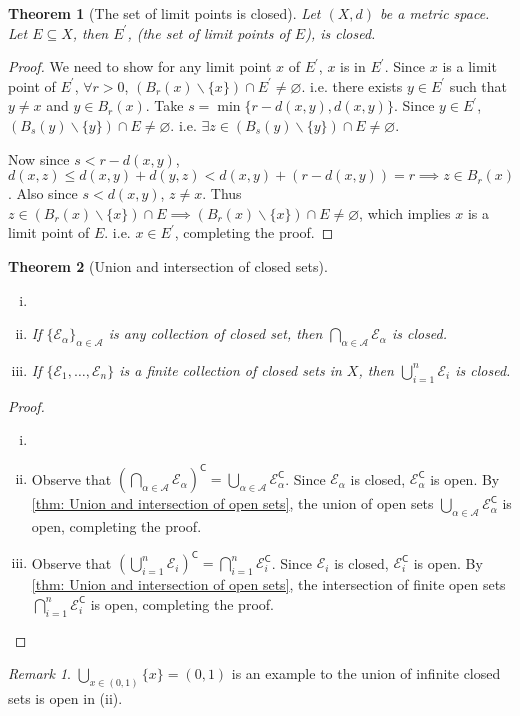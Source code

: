 \documentclass[12pt, lettersize]{book}
\theoremstyle{plain}
\newtheorem{thm}{Theorem}[section]
\theoremstyle{definition}
\theoremstyle{remark}
\newtheorem*{rem}{Remark}
\newcommand{\com}{\mathsf{C}}
\let\emptyset\varnothing
\begin{document}
		\begin{thm}[The set of limit points is closed]
		Let $(X,d)$ be a metric space. Let $E\subseteq X$, then $E^\prime$, (the set of limit points of $E$), is closed.
		\end{thm}
		\begin{proof}
		We need to show for any limit point $x$ of $E^\prime$, $x$ is in $E^\prime$. Since $x$ is a limit point of $E^\prime$, $\forall r>0$, $(B_r(x)\backslash\{x\})\cap E^\prime\neq\emptyset$. i.e. there exists $y\in E^\prime$ such that $y\neq x$ and $y\in B_r(x)$. Take $s=\min\{r-d(x,y), d(x,y)\}$. Since $y\in E^\prime$, $(B_s(y)\backslash\{y\})\cap E\neq\emptyset$. i.e. $\exists z\in(B_s(y)\backslash\{y\})\cap E\neq\emptyset$.\smallskip
		
		Now since $s<r-d(x,y)$, $d(x,z)\leq d(x,y)+d(y,z)<d(x,y)+(r-d(x,y))=r\implies z\in B_r(x)$. Also since $s<d(x,y)$, $z\neq x$. Thus $z\in(B_r(x)\backslash\{x\})\cap E\implies (B_r(x)\backslash\{x\})\cap E\neq\emptyset$, which implies $x$ is a limit point of $E$. i.e. $x\in E^\prime$, completing the proof. 
		\end{proof}
		
		\begin{thm}[Union and intersection of closed sets]
		\begin{enumerate}[(i)]
			\item[]
			\item If $\{\mathcal{E}_\alpha\}_{\alpha\in\mathcal{A}}$ is any collection of closed set, then $\bigcap_{\alpha\in\mathcal{A}}\mathcal{E}_\alpha$ is closed.
			\item If $\{\mathcal{E}_1,\dots,\mathcal{E}_n\}$ is a finite collection of closed sets in $X$, then $\bigcup_{i=1}^{n}\mathcal{E}_i$ is closed.
		\end{enumerate}
		\end{thm}
		\begin{proof}
		\begin{enumerate}[(i)]
			\item[]
			\item Observe that $\left(\bigcap_{\alpha\in\mathcal{A}}\mathcal{E}_\alpha\right)^\com=\bigcup_{\alpha\in\mathcal{A}}\mathcal{E}_\alpha^\com$. Since $\mathcal{E}_\alpha$ is closed, $\mathcal{E}_\alpha^\com$ is open. By \ref{thm: Union and intersection of open sets}, the union of open sets $\bigcup_{\alpha\in\mathcal{A}}\mathcal{E}_\alpha^\com$ is open, completing the proof.
			\item Observe that $\left(\bigcup_{i=1}^{n}\mathcal{E}_i\right)^\com=\bigcap_{i=1}^{n}\mathcal{E}_i^\com$. Since $\mathcal{E}_i$ is closed, $\mathcal{E}_i^\com$ is open. By \ref{thm: Union and intersection of open sets}, the intersection of finite open sets $\bigcap_{i=1}^{n}\mathcal{E}_i^\com$ is open, completing the proof.
		\end{enumerate}
		\end{proof}
		\begin{rem}
			$\bigcup_{x\in(0,1)}\{x\}=(0,1)$ is an example to the union of infinite closed sets is open in (ii).
		\end{rem}
		\newpage
			
\end{document}
